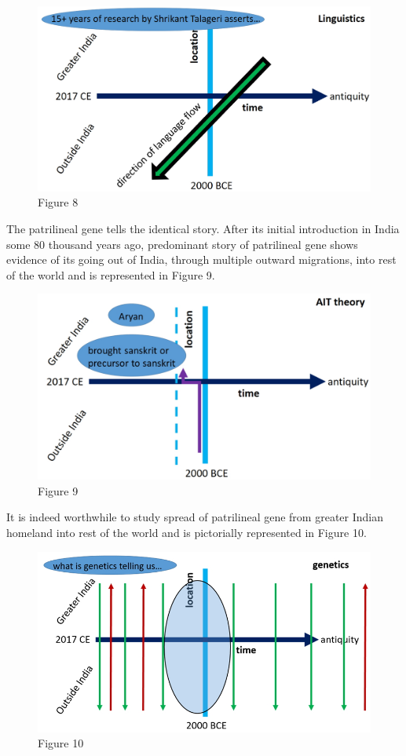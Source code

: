 \begin{figure}
\includegraphics{"images/8-08.jpg"}
\caption{Figure 8}
\end{figure}

The patrilineal gene tells the identical story. After its initial introduction in India some 80 thousand years ago, predominant story of patrilineal gene shows evidence of its going out of India, through multiple outward migrations, into rest of the world and is represented in Figure 9.

\begin{figure}
\includegraphics{"images/8-09.jpg"}
\caption{Figure 9}
\end{figure}

It is indeed worthwhile to study spread of patrilineal gene from greater Indian homeland into rest of the world and is pictorially represented in Figure 10.

\begin{figure}
\includegraphics{"images/8-10.jpg"}
\caption{Figure 10}
\end{figure}

